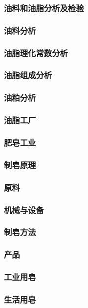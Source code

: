 \documentclass[UTF8]{../../ApplicationUniverse}
\begin{document}
\subsubsection{油料和油脂分析及检验}
    \subsubsection{油料分析}
    \subsubsection{油脂理化常数分析}
    \subsubsection{油脂组成分析}
    \subsubsection{油粕分析}
\subsubsection{油脂工厂}
    \subsubsection{肥皂工业}
    \subsubsection{制皂原理}
    \subsubsection{原料}
    \subsubsection{机械与设备}
    \subsubsection{制皂方法}
    \subsubsection{产品}
        \subsubsection{工业用皂}
        \subsubsection{生活用皂}
\end{document}
